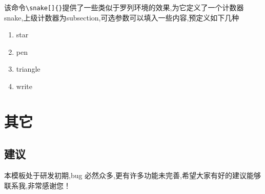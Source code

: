\documentclass{memory}
\begin{document}
该命令\verb|\snake[]{}|提供了一些类似于罗列环境的效果,为它定义了一个计数器snake,上级计数器为subsection,可选参数可以填入一些内容,预定义如下几种
\begin{enumerate}
    \item star  \textcolor{red}{}
    \item pen   \textcolor{magenta}{}
    \item triangle \textcolor{red}{}
    \item write   \textcolor{cyan}{}
\end{enumerate}
\section{其它}
\subsection{建议}
本模板处于研发初期,bug 必然众多,更有许多功能未完善,希望大家有好的建议能够联系我,非常感谢您！
\end{document}
